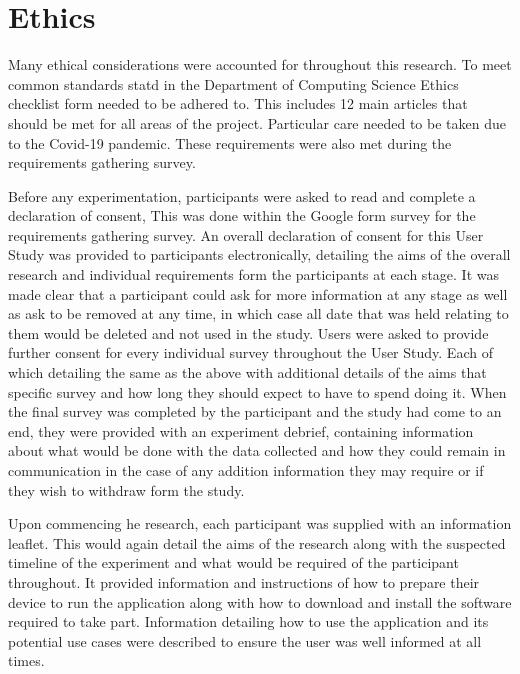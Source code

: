 \documentclass{l4proj}
\begin{document}
\section{Ethics}
Many ethical considerations were accounted for throughout this research. To meet common standards statd in the Department of Computing Science Ethics checklist form needed to be adhered to. This includes 12 main articles that should be met for all areas of the project. Particular care needed to be taken due to the Covid-19 pandemic. These requirements were also met during the requirements gathering survey.

Before any experimentation, participants were asked to read and complete a declaration of consent, This was done within the Google form survey for the requirements gathering survey. An overall declaration of consent for this User Study was provided to participants electronically, detailing the aims of the overall research and individual requirements form the participants at each stage. It was made clear that a participant could ask for more information at any stage as well as ask to be removed at any time, in which case all date that was held relating to them would be deleted and not used in the study. Users were asked to provide further consent for every individual survey throughout the User Study. Each of which detailing the same as the above with additional details of the aims that specific survey and how long they should expect to have to spend doing it. When the final survey was completed by the participant and the study had come to an end, they were provided with an experiment debrief, containing information about what would be done with the data collected and how they could remain in communication in the case of any addition information they may require or if they wish to withdraw form the study. 

Upon commencing he research, each participant was supplied with an information leaflet. This would again detail the aims of the research along with the suspected timeline of the experiment and what would be required of the participant throughout. It provided information and instructions of how to prepare their device to run the application along with how to download and install the software required to take part. Information detailing how to use the application and its potential use cases were described to ensure the user was well informed at all times. 
\end{document}

